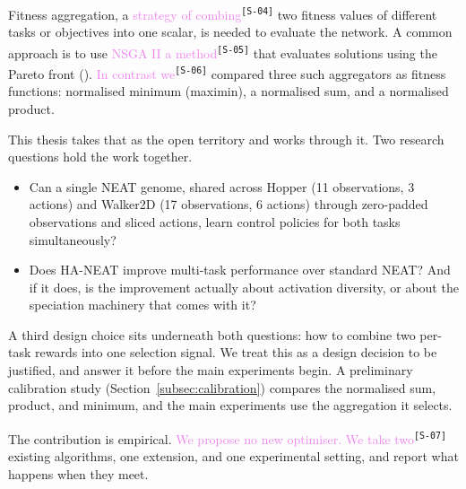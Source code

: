 \documentclass[12pt]{article}
\newcommand{\revID}[1]{\textsuperscript{\scriptsize\texttt{[#1]}}}
\newcommand{\revStyle}[2]{\textcolor{violet}{#2}\revID{#1}}   %
\begin{document}
Fitness aggregation, a \revStyle{S-04}{strategy of combing} two fitness values of different tasks or objectives into one scalar, is needed to evaluate the network. 
A common approach is to use \revStyle{S-05}{NSGA II a method} that evaluates solutions using the Pareto front (\cite{deb_fast_2002}).
\revStyle{S-06}{In contrast we} compared three such aggregators as fitness functions:  normalised minimum (maximin), a normalised sum, and a normalised product.



This thesis takes that as the open territory and works through it.
Two research questions hold the work together.
\begin{itemize}
    \item Can a single NEAT genome, shared across Hopper (11 observations, 3 actions) and Walker2D (17 observations, 6 actions) through zero-padded observations and sliced actions, learn control policies for both tasks simultaneously?
    \item Does HA-NEAT improve multi-task performance over standard NEAT? And if it does, is the improvement actually about activation diversity, or about the speciation machinery that comes with it?
\end{itemize}
A third design choice sits underneath both questions: how to combine two per-task rewards into one selection signal.
We treat this as a design decision to be justified, and answer it before the main experiments begin.
A preliminary calibration study (Section~\ref{subsec:calibration}) compares the normalised sum, product, and minimum, and the main experiments use the aggregation it selects.

The contribution is empirical.
\revStyle{S-07}{We propose no new optimiser. We take two} existing algorithms, one extension, and one experimental setting, and report what happens when they meet.
\end{document}
